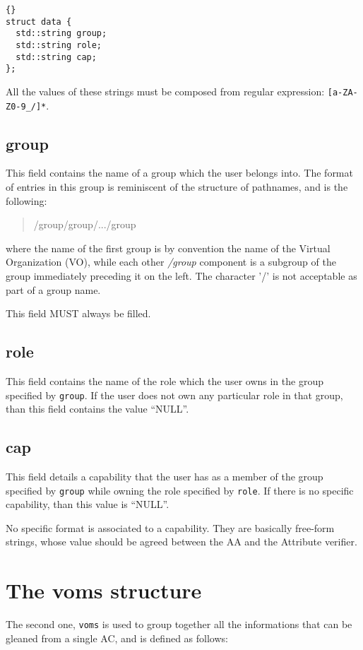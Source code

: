 \documentclass[a4paper]{book}
\begin{document}
\begin{lstlisting}{}
struct data {
  std::string group; 
  std::string role;  
  std::string cap;   
};
\end{lstlisting}

All the values of these strings must be composed from regular
expression: \texttt{[a-ZA-Z0-9\_/]*}.

\subsection{group}
This field contains the name of a group which the user belongs into.
The format of entries in this group is reminiscent of the structure of
pathnames, and is the following:
\begin{quote}
\begin{emph}
/group/group/.../group
\end{emph}
\end{quote}
where the name of the first group is by convention the name of the
Virtual Organization (VO), while each other \emph{/group} component is
a subgroup of the group immediately preceding it on the left. The
character '/' is not acceptable as part of a group name.

This field MUST always be filled.

\subsection{role}
This field contains the name of the role which the user owns in the
group specified by \texttt{group}.  If the user does not own any
particular role in that group, than this field contains the value
``NULL''.

\subsection{cap}
This field details a capability that the user has as a member of the
group specified by \texttt{group} while owning the role specified by
\texttt{role}.  If there is no specific capability, than this value is
``NULL''. 

No specific format is associated to a capability.  They are basically
free-form strings, whose value should be agreed between the AA and the
Attribute verifier.

\section{The voms structure}
The second one, \texttt{voms} is used to group together all the
informations that can be gleaned from a single AC, and is defined as
follows:
\end{document}
